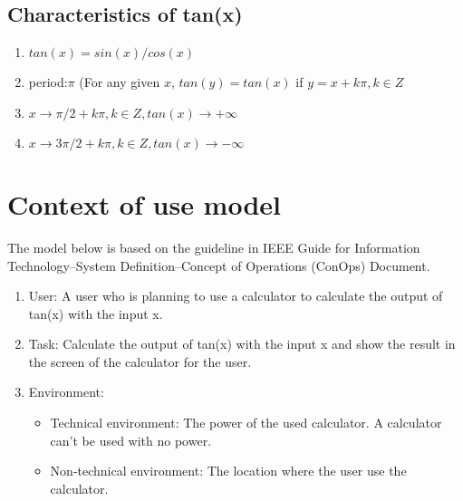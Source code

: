 \documentclass[10pt,a4paper,twoside]{article}
\begin{document}




\subsection{Characteristics of tan(x)}
\begin{enumerate}
\item $tan(x)=sin(x)/cos(x)$
\item period:$\pi$ (For any given $x$, $tan(y)=tan(x)$ if $y = x + k\pi, k \in Z$
\item $x\rightarrow \pi /2+k\pi, k\in Z,tan(x)\rightarrow+\infty$
\item $x\rightarrow3\pi/2+k\pi, k\in Z,tan(x)\rightarrow-\infty$
\end{enumerate}


\section{Context of use model}
The model below is based on the guideline in IEEE Guide for Information Technology--System Definition--Concept of Operations (ConOps) Document.
\cite{1998702}
\begin{enumerate}
\item 
User: A user who is planning to use a calculator to calculate the output of tan(x) with the input x.
\item
Task: Calculate the output of tan(x) with the input x and show the result in the screen of the calculator for the user.
\item
Environment:
\begin{itemize}
\item Technical environment:
The power of the used calculator. A calculator can't be used with no power.
\item Non-technical environment:
The location where the user use the calculator.
\end{itemize}
\end{enumerate}


\printbibliography
\end{document}
